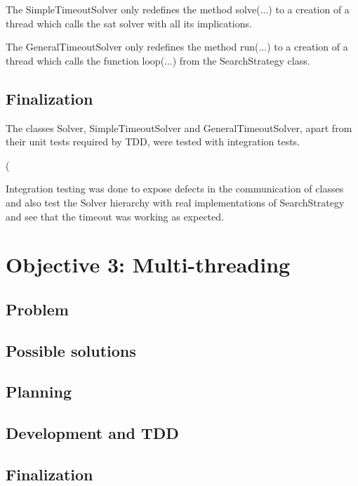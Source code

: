 The SimpleTimeoutSolver only redefines the method solve(...) to a creation of a thread which calls the sat solver with all its implications. 

The GeneralTimeoutSolver only redefines the method run(...) to a creation of a thread which calls the function loop(...) from the SearchStrategy class.  

\subsection{Finalization}
The classes Solver, SimpleTimeoutSolver and GeneralTimeoutSolver, apart from their unit tests required by TDD, were tested with integration tests.  

(%



Integration testing was done to expose defects in the communication of classes and also test the Solver hierarchy with real implementations of SearchStrategy and see that the timeout was working as expected. 

\section{Objective 3: Multi-threading}
\subsection{Problem}


\subsection{Possible solutions}

\subsection{Planning}

\subsection{Development and TDD}

\subsection{Finalization}
